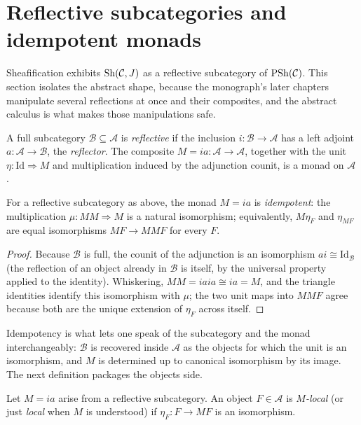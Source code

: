 \section{Reflective subcategories and idempotent monads}\label{ch04:sec:reflective}

Sheafification exhibits $\mathrm{Sh}(\mathcal{C},J)$ as a reflective subcategory of
$\mathrm{PSh}(\mathcal{C})$. This section isolates the abstract shape, because the monograph's
later chapters manipulate several reflections at once and their composites,
and the abstract calculus is what makes those manipulations safe.

\begin{definition}\label{ch04:def:reflective}
A full subcategory $\mathcal{B}\subseteq\mathcal{A}$ is \emph{reflective} if
the inclusion $i:\mathcal{B}\to\mathcal{A}$ has a left adjoint
$a:\mathcal{A}\to\mathcal{B}$, the \emph{reflector}. The composite
$M=ia:\mathcal{A}\to\mathcal{A}$, together with the unit
$\eta:\mathrm{Id}\Rightarrow M$ and multiplication induced by the adjunction
counit, is a monad on $\mathcal{A}$ \cite{maclanecwm,riehl,awodey}.
\end{definition}

\begin{proposition}[Idempotency]\label{ch04:prop:idempotent}
For a reflective subcategory as above, the monad $M=ia$ is \emph{idempotent}:
the multiplication $\mu:MM\Rightarrow M$ is a natural isomorphism;
equivalently, $M\eta_F$ and $\eta_{MF}$ are equal isomorphisms
$MF\to MMF$ for every $F$.
\end{proposition}

\begin{proof}
Because $\mathcal{B}$ is full, the counit of the adjunction is an isomorphism
$a i\cong\mathrm{Id}_{\mathcal{B}}$ (the reflection of an object already in
$\mathcal{B}$ is itself, by the universal property applied to the identity).
Whiskering, $MM=iaia\cong ia=M$, and the triangle identities identify this
isomorphism with $\mu$; the two unit maps into $MMF$ agree because both are
the unique extension of $\eta_F$ across itself.
\end{proof}

Idempotency is what lets one speak of the subcategory and the monad
interchangeably: $\mathcal{B}$ is recovered inside $\mathcal{A}$ as the
objects for which the unit is an isomorphism, and $M$ is determined up to
canonical isomorphism by its image. The next definition packages the objects
side.

\begin{definition}\label{ch04:def:local}
Let $M=ia$ arise from a reflective subcategory. An object $F\in\mathcal{A}$ is
\emph{$M$-local} (or just \emph{local} when $M$ is understood) if
$\eta_F:F\to MF$ is an isomorphism.
\end{definition}

